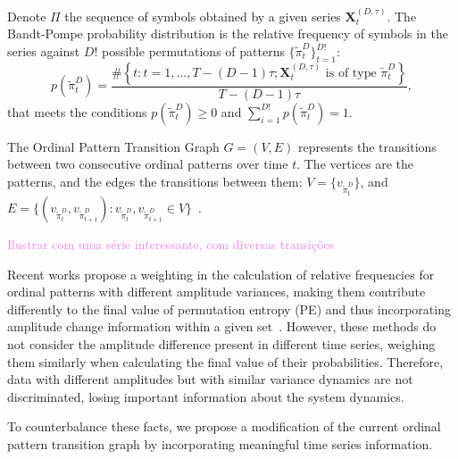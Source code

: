 \documentclass{isprs}
\begin{document}
Denote $\Pi$ the sequence of symbols obtained by a given series $\mathbf{X}_t^{(D,\tau)}$.
The Bandt-Pompe probability distribution is the relative frequency of symbols in the series against $D!$ possible permutations of patterns $\{\widetilde\pi_t^D \}_{t = 1}^{D!}$:
\begin{equation}
p(\widetilde\pi_t^D) = \frac{\#\left \{t : t = 1, \dots, T-(D-1)\tau; \mathbf{X}_t^{(D,\tau)} \text{ is of type } \widetilde\pi_t^D\right \}}{T- (D-1)\tau},  
\end{equation}
that meets the conditions $p(\widetilde\pi_t^D) \ge 0$ and  $\sum_{i=1}^{D!} p(\widetilde\pi_t^D) = 1$.

The Ordinal Pattern Transition Graph ${G} = ({V}, {E})$ 
represents the transitions between two consecutive ordinal patterns over time $t$.
The vertices are the patterns, and the edges the transitions between them:
$V = \{v_{\widetilde\pi_t^D}\}$, and 
$E = \{(v_{\widetilde\pi_t^D}, v_{\widetilde\pi_{t+1}^D}): v_{\widetilde\pi_t^D}, v_{\widetilde\pi_{t+1}^D} \in V \}$~\cite{LearningandDistinguishingTimeSeriesDynamicsViaOrdinalPatternsTransitionGraphs2019}.

\textcolor{violet}{Ilustrar com uma s\'erie interessante, com diversas transi\c c\~oes}

Recent works propose a weighting in the calculation of relative frequencies for ordinal patterns with different amplitude variances, making them contribute differently to the final value of permutation entropy (PE) and thus incorporating amplitude change information within a given set~\cite{Fadlallah2013Weightedpermutation}.
However, these methods do not consider the amplitude difference present in different time series, weighing them similarly when calculating the final value of their probabilities.
Therefore, data with different amplitudes but with similar variance dynamics are not discriminated, losing important information about the system dynamics.

To counterbalance these facts, we propose a modification of the current ordinal pattern transition graph by incorporating meaningful time series information.
\end{document}
